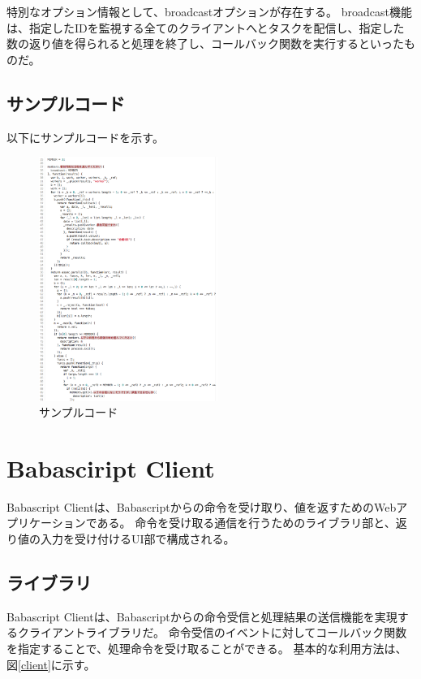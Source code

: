 特別なオプション情報として、broadcastオプションが存在する。
broadcast機能は、指定したIDを監視する全てのクライアントへとタスクを配信し、指定した数の返り値を得られると処理を終了し、コールバック関数を実行するといったものだ。

\subsection{サンプルコード}\label{ux30b5ux30f3ux30d7ux30ebux30b3ux30fcux30c9}

以下にサンプルコードを示す。

\begin{figure}[h]
  \centering  
  \includegraphics[width=220px]{./images/samplecode.png}
  \caption{サンプルコード}
  \label{sample}
\end{figure}

\section{Babasciript Client}\label{babasciript-client}

Babascript
Clientは、Babascriptからの命令を受け取り、値を返すためのWebアプリケーションである。
命令を受け取る通信を行うためのライブラリ部と、返り値の入力を受け付けるUI部で構成される。

\subsection{ライブラリ}\label{ux30e9ux30a4ux30d6ux30e9ux30ea}

Babascript
Clientは、Babascriptからの命令受信と処理結果の送信機能を実現するクライアントライブラリだ。
命令受信のイベントに対してコールバック関数を指定することで、処理命令を受け取ることができる。
基本的な利用方法は、図\ref{client}に示す。

